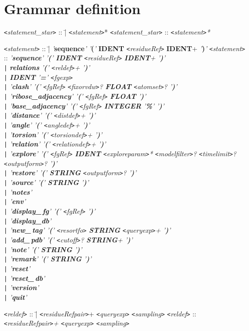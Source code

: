 \documentclass[11pt]{article}
\newcommand{\keyword}[1]{{\rm {\tt <}{\em #1}{\tt >}}}
\newcommand{\nonterminal}[1]{{\rm {\tt <}{\em #1}{\tt >}}}
\newcommand{\terminal}[1]{{\em '}{\bf #1}{\em '}}
\newcommand{\token}[1]{{\bf #1}}
\newenvironment{grammarrule}[2]{\begin{tabbing}
    \keyword{#1} :: \= | \= #2 \kill
    \keyword{#1} :: \> \> {\em #2} \\}
  {\end{tabbing}}
\newcommand{\altrule}[1]{\> {\tt |} \> {\em #1} \\}
\begin{document}
\appendix
\newpage
\section{Grammar definition}
\label{app:grammar}

\begin{grammarrule}{statement\_star}{\nonterminal{statement}*}
\end{grammarrule}
\begin{grammarrule}{statement}{\terminal{sequence} \terminal{(} \token{IDENT}
    \nonterminal{residueRef} \token{IDENT}+ \terminal{)}}
  \altrule{\token{relations} \terminal{(} \nonterminal{reldef}+ \terminal{)}}
  \altrule{\token{IDENT} \terminal{=} \nonterminal{fgexp}}
  \altrule{\terminal{clash} \terminal{(} \nonterminal{fgRef}
    \nonterminal{fixorvdw}? \token{FLOAT} \nonterminal{atomset}?
    \terminal{)}}
  \altrule{\terminal{ribose\_adjacency} \terminal{(} \nonterminal{fgRef}
  \token{FLOAT} \terminal{)}}
  \altrule{\terminal{base\_adjacency} \terminal{(} \nonterminal{fgRef}
    \token{INTEGER} \terminal{\%} \terminal{)}}
  \altrule{\terminal{distance} \terminal{(} \nonterminal{distdef}+ \terminal{)}}
  \altrule{\terminal{angle} \terminal{(} \nonterminal{angledef}+ \terminal{)}}
  \altrule{\terminal{torsion} \terminal{(} \nonterminal{torsiondef}+
    \terminal{)}}
  \altrule{\terminal{relation} \terminal{(} \nonterminal{relationdef}+
    \terminal{)}}
  \altrule{\terminal{explore} \terminal{(} \nonterminal{fgRef} \token{IDENT} \nonterminal{exploreparam}* \nonterminal{modelfilter}? \nonterminal{timelimit}? \nonterminal{outputform}? \terminal{)}}
  \altrule{\terminal{restore} \terminal{(} \token{STRING}
    \nonterminal{outputform}? \terminal{)}}
  \altrule{\terminal{source} \terminal{(} \token{STRING} \terminal{)}}
  \altrule{\terminal{notes}}
  \altrule{\terminal{env}}
  \altrule{\terminal{display\_\,fg} \terminal{(} \nonterminal{fgRef}
    \terminal{)}}
  \altrule{\terminal{display\_db}}
  \altrule{\terminal{new\_\,tag} \terminal{(} \nonterminal{resortfo}
    \token{STRING} \nonterminal{queryexp}+ \terminal{)}}
  \altrule{\terminal{add\_\,pdb} \terminal{(} \nonterminal{cutoff}? \token{STRING}+
    \terminal{)}}
  \altrule{\terminal{note} \terminal{(} \token{STRING} \terminal{)}}
  \altrule{\terminal{remark} \terminal{(} \token{STRING} \terminal{)}}
  \altrule{\terminal{reset}}
  \altrule{\terminal{reset\_\,db}}
  \altrule{\terminal{version}}
  \altrule{\terminal{quit}}
\end{grammarrule}
\begin{grammarrule}{reldef}{\nonterminal{residueRefpair}+ \nonterminal{queryexp} \nonterminal{sampling}}
\end{grammarrule}
\end{document}
